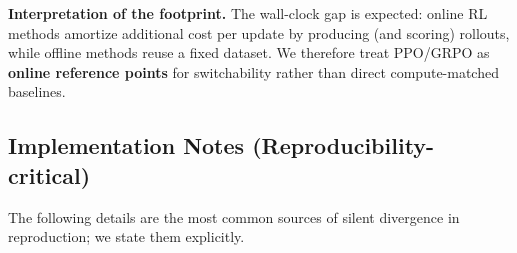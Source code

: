 \vspace{-0.35em}
\noindent\textbf{Interpretation of the footprint.}
The wall-clock gap is expected: online RL methods amortize additional cost per update by producing (and scoring) rollouts, while offline methods reuse a fixed dataset.
We therefore treat \textsc{PPO}/\textsc{GRPO} as \textbf{online reference points} for switchability rather than direct compute-matched baselines.

\subsection{Implementation Notes (Reproducibility-critical)}

\vspace{-0.25em}
\noindent
The following details are the most common sources of silent divergence in reproduction; we state them explicitly.


